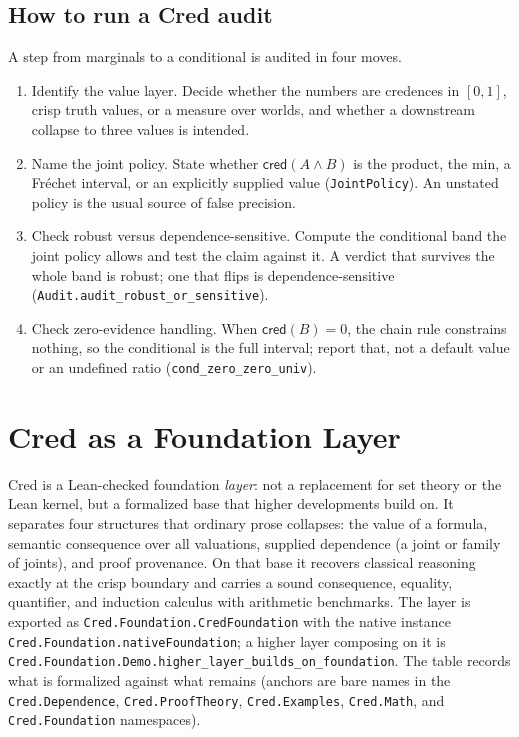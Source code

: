 \documentclass[11pt,a4paper]{article}
\newcommand{\cred}{\mathsf{cred}}
\newcommand{\Lean}[1]{\texttt{#1}}
\begin{document}
\subsection{How to run a Cred audit}
\label{sec:cookbook}

A step from marginals to a conditional is audited in four moves.

\begin{enumerate}[leftmargin=*,nosep]
\item Identify the value layer.  Decide whether the numbers are
  credences in $[0,1]$, crisp truth values, or a measure over worlds, and
  whether a downstream collapse to three values is intended.
\item Name the joint policy.  State whether $\cred(A\wedge B)$ is the
  product, the min, a Fr\'echet interval, or an explicitly supplied
  value (\Lean{JointPolicy}).  An unstated policy is the usual source of
  false precision.
\item Check robust versus dependence-sensitive.  Compute the conditional
  band the joint policy allows and test the claim against it.  A verdict
  that survives the whole band is robust; one that flips is
  dependence-sensitive (\Lean{Audit.audit\_robust\_or\_sensitive}).
\item Check zero-evidence handling.  When $\cred(B)=0$, the chain rule
  constrains nothing, so the conditional is the full interval; report
  that, not a default value or an undefined ratio
  (\Lean{cond\_zero\_zero\_univ}).
\end{enumerate}

\section{Cred as a Foundation Layer}
\label{sec:foundations}

Cred is a Lean-checked foundation \emph{layer}: not a replacement for set
theory or the Lean kernel, but a formalized base that higher developments
build on.  It separates four structures that ordinary prose collapses: the
value of a formula, semantic consequence over all valuations, supplied
dependence (a joint or family of joints), and proof provenance.  On that
base it recovers classical reasoning exactly at the crisp boundary and
carries a sound consequence, equality, quantifier, and induction calculus
with arithmetic benchmarks.  The layer is exported as
\Lean{Cred.Foundation.CredFoundation} with the native instance
\Lean{Cred.Foundation.nativeFoundation}; a higher layer composing on it is
\Lean{Cred.Foundation.Demo.higher\_layer\_builds\_on\_foundation}.  The table
records what is formalized against what remains (anchors are bare names in
the \texttt{Cred.Dependence}, \texttt{Cred.ProofTheory}, \texttt{Cred.Examples},
\texttt{Cred.Math}, and \texttt{Cred.Foundation} namespaces).
\end{document}

